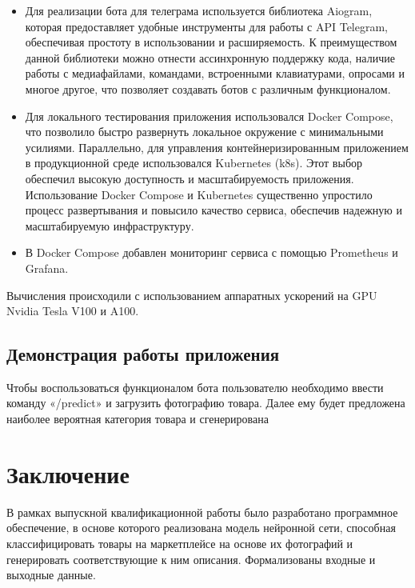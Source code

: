 \documentclass[a4paper,12pt]{extarticle}
\begin{document}
\begin{itemize}
	\item Для реализации бота для телеграма используется библиотека Aiogram\cite{aiogram}, которая предоставляет удобные инструменты для работы с API Telegram, обеспечивая простоту в использовании и расширяемость. К преимуществом данной библиотеки можно отнести ассинхронную поддержку кода, наличие работы с медиафайлами, командами, встроенными клавиатурами, опросами и многое другое, что позволяет создавать ботов с различным функционалом.
	\item Для локального тестирования приложения использовался Docker Compose\cite{docker}, что позволило быстро развернуть локальное окружение с минимальными усилиями. Параллельно, для управления контейнеризированным приложением в продукционной среде использовался Kubernetes (k8s)\cite{kubernetes}. Этот выбор обеспечил высокую доступность и масштабируемость приложения.
	Использование Docker Compose и Kubernetes существенно упростило процесс развертывания и повысило качество сервиса, обеспечив надежную и масштабируемую инфраструктуру.
	\item В Docker Compose добавлен мониторинг сервиса с помощью Prometheus\cite{prometheus} и Grafana\cite{grafana}.
\end{itemize}

Вычисления происходили с использованием аппаратных ускорений на GPU Nvidia Tesla V100 и A100.

\subsection{Демонстрация работы приложения}

Чтобы воспользоваться функционалом бота пользователю необходимо ввести команду «/predict» и загрузить фотографию товара. Далее ему будет предложена наиболее вероятная категория товара и сгенерирована
\newpage
\section*{Заключение}

В рамках выпускной квалификационной работы было разработано программное обеспечение, в основе которого реализована модель нейронной сети, способная классифицировать товары на маркетплейсе на основе их фотографий и генерировать соответствующие к ним описания. Формализованы входные и выходные данные.
\end{document}
